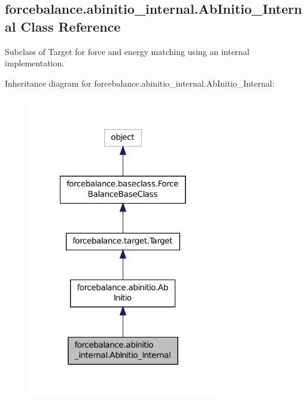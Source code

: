 \hypertarget{classforcebalance_1_1abinitio__internal_1_1AbInitio__Internal}{\subsection{forcebalance.\-abinitio\-\_\-internal.\-Ab\-Initio\-\_\-\-Internal Class Reference}
\label{classforcebalance_1_1abinitio__internal_1_1AbInitio__Internal}
}


Subclass of Target for force and energy matching using an internal implementation.  




Inheritance diagram for forcebalance.\-abinitio\-\_\-internal.\-Ab\-Initio\-\_\-\-Internal\-:\nopagebreak
\begin{figure}[H]
\begin{center}
\leavevmode
\includegraphics[width=236pt]{classforcebalance_1_1abinitio__internal_1_1AbInitio__Internal__inherit__graph}
\end{center}
\end{figure}


